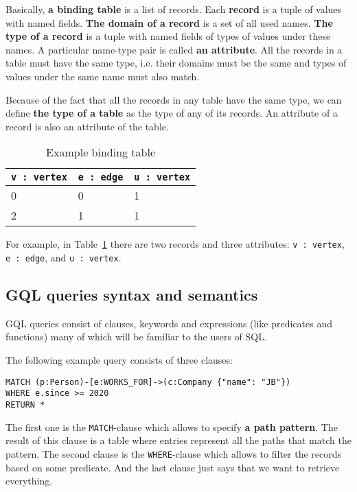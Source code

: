 \documentclass[14pt]{constructor-thesis}
\theoremstyle{definition}
\begin{document}
Basically, \textbf{a binding table} is a list of records. Each \textbf{record} is a tuple of values with named fields. \textbf{The domain of a record} is a set of all used names. \textbf{The type of a record} is a tuple with named fields of types of values under these names. A particular name-type pair is called \textbf{an attribute}. All the records in a table must have the same type, i.e. their domains must be the same and types of values under the same name must also match.

Because of the fact that all the records in any table have the same type, we can define \textbf{the type of a table} as the type of any of its records. An attribute of a record is also an attribute of the table.

\begin{table}
  \centering
  
  \begin{tabular}{ |p{3cm}|p{3cm}|p{3cm}|  }
    \hline
    \texttt{v : vertex} & \texttt{e : edge} & \texttt{u : vertex} \\
    \hline
    0 & 0 & 1 \\
    2 & 1 & 1 \\
    \hline
  \end{tabular}

  \caption{Example binding table}
  \label{tab:example-binding-table}
\end{table}

For example, in Table~\ref{tab:example-binding-table} there are two records and three attributes: \texttt{v : vertex}, \texttt{e : edge}, and \texttt{u : vertex}. 


\subsection{GQL queries syntax and semantics}
\label{section:intro-GQL}

GQL queries consist of clauses, keywords and expressions (like predicates and functions) many of which will be familiar to the users of SQL.


The following example query consists of three clauses:
\begin{verbatim}
MATCH (p:Person)-[e:WORKS_FOR]->(c:Company {"name": "JB"})
WHERE e.since >= 2020
RETURN *
\end{verbatim}

The first one is the \texttt{MATCH}-clause which allows to specify \textbf{a path pattern}. The result of this clause is a table where entries represent all the paths that match the pattern. The second clause is the \texttt{WHERE}-clause which allows to filter the records based on some predicate. And the last clause just says that we want to retrieve everything.
\end{document}
